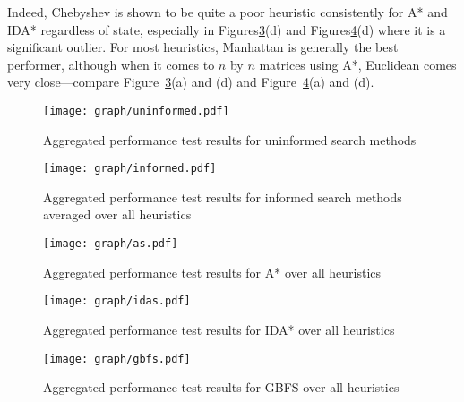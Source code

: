 Indeed, Chebyshev is shown to be quite a poor heuristic consistently for A* and IDA*
regardless of state, especially in Figures\ref{fig:as}(d) and Figures\ref{fig:idas}(d)
where it is a significant outlier. For most heuristics, Manhattan is generally the
best performer, although when it comes to $n$ by $n$ matrices using A*, Euclidean comes
very close---compare Figure~\ref{fig:as}(a) and (d) and Figure~\ref{fig:idas}(a) and (d).

\begin{figure}[h!]
  \centering
  \texttt{[image: graph/uninformed.pdf]}
  \caption{Aggregated performance test results for uninformed search methods}
  \label{fig:uninformed}
\end{figure}

\begin{figure}[h!]
  \centering
  \texttt{[image: graph/informed.pdf]}
  \caption{Aggregated performance test results for informed search methods averaged over all heuristics}
  \label{fig:informed}
\end{figure}

\begin{figure}[h!]
  \centering
  \texttt{[image: graph/as.pdf]}
  \caption{Aggregated performance test results for A* over all heuristics}
  \label{fig:as}
\end{figure}

\begin{figure}[h!]
  \centering
  \texttt{[image: graph/idas.pdf]}
  \caption{Aggregated performance test results for IDA* over all heuristics}
  \label{fig:idas}
\end{figure}

\begin{figure}[h!]
  \centering
  \texttt{[image: graph/gbfs.pdf]}
  \caption{Aggregated performance test results for GBFS over all heuristics}
  \label{fig:gbfs}
\end{figure}
